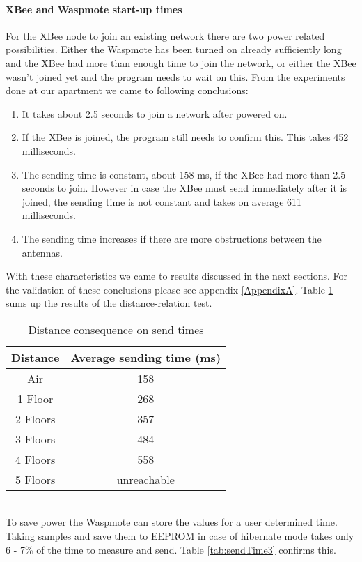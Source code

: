 \paragraph{XBee and Waspmote start-up times}
\label{startup}
For the XBee node to join an existing network there are two power related possibilities. Either the Waspmote has been turned on already sufficiently long and the XBee had more than enough time to join the network, or either the XBee wasn't joined yet and the program needs to wait on this. From the experiments done at our apartment we came to following conclusions:
\begin{enumerate}
\item It takes about 2.5 seconds to join a network after powered on.
\item If the XBee is joined, the program still needs to confirm this. This takes 452 milliseconds.
\item The sending time is constant, about 158 ms, if the XBee had more than 2.5 seconds to join. However in case the XBee must send immediately after it is joined, the sending time is not constant and takes on average 611 milliseconds.
\item The sending time increases if there are more obstructions between the antennas. 
\end{enumerate}
With these characteristics we came to results discussed in the next sections. For the validation of these conclusions please see appendix \ref{AppendixA}. Table \ref{tab:sendTime} sums up the results of the distance-relation test.
\begin{table}[!ht]
\begin{center}
\begin{tabular}[!ht]{|c|c|}
\hline
\textbf{Distance} & \textbf{Average sending time (ms)}\\
\hline
Air & 158\\
\hline
1 Floor & 268\\
\hline
2 Floors & 357\\
\hline
3 Floors & 484\\
\hline
4 Floors & 558\\
\hline
5 Floors & unreachable\\
\hline
\end{tabular}
\caption{Distance consequence on send times}
\label{tab:sendTime}
\end{center}
\end{table}\\
To save power the Waspmote can store the values for a user determined time. Taking samples and save them to EEPROM in case of hibernate mode takes only 6 - 7\% of the time to measure and send. Table \ref{tab:sendTime3} confirms this.
